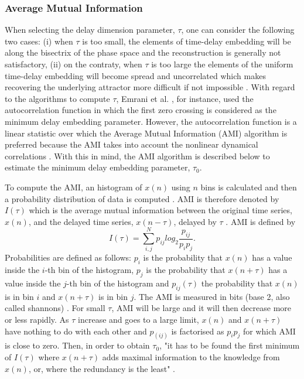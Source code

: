 \documentclass[fleqn,10pt]{wlscirep}
\begin{document}
\subsubsection*{Average Mutual Information}
When selecting the delay dimension parameter, $\tau$, one can consider the following two cases:
(i) when $\tau$ is too small, the elements of time-delay embedding will be along the bisectrix of the phase space and the reconstruction is generally not satisfactory,
(ii) on the contraty, when $\tau$ is too large the elements of the uniform time-delay embedding will become spread and uncorrelated which makes recovering the underlying attractor more difficult if not impossible \cite{casdagli1991, emrani2014a, garcia2005e71}.
With regard to the algorithms to compute $\tau$, Emrani et al. \cite{emrani2014a}, for instance, used the autocorrelation function in which the first zero crossing is considered as the minimum delay embedding parameter.
However, the autocorrelation function is a linear statistic over which the Average Mutual Information (AMI) algorithm is preferred because the AMI takes into account the nonlinear dynamical correlations \cite{afraser1986,krakovska2015}.
With this in mind, the AMI algorithm is described below to estimate the minimum delay embedding parameter, \texorpdfstring{$\tau_0$}{T}.

To compute the AMI, an histogram of $x(n)$ using $n$ bins is calculated and then a probability distribution of data is computed \cite{kantz2003}.
AMI is therefore denoted by $I(\tau)$ which is the average mutual information between the original time series, $x(n)$, and the delayed time series, $x(n-\tau)$, delayed by $\tau$ \cite{kabiraj2012}.
AMI is defined by
\begin{equation}\label{eq:ami}
I(\tau) = \sum_{i,j}^N p_{ij} log_2 \frac{ p_{ij} }{ p_i p_j }.
\end{equation}
Probabilities are defined as follows:
$p_i$ is the probability that $x(n)$ has a value inside the $i$-th bin of the histogram, $p_j$ is the probability that $x(n+\tau)$ has a value inside the $j$-th bin of the histogram and $p_{ij}(\tau)$ the probability that $x(n)$ is in bin $i$ and $x(n+\tau)$ is in bin $j$. The AMI is measured in bits (base 2, also called shannons) \cite{kantz2003, nonlinearTseries2016}.
For small $\tau$, AMI will be large and it will then decrease more or less rapidly. As $\tau$ increase and goes to a large limit, $x(n)$ and $x(n+\tau)$ have nothing to do with each other and $p_(ij)$ is factorised as $p_ip_j$ for which AMI is close to zero.
Then, in order to obtain $\tau_0$, "it has to be found the first minimum of $I(\tau)$ where $x(n+\tau)$ adds maximal information to the knowledge from $x(n)$, or, where the redundancy is the least" \cite{kantz2003}.
\end{document}
